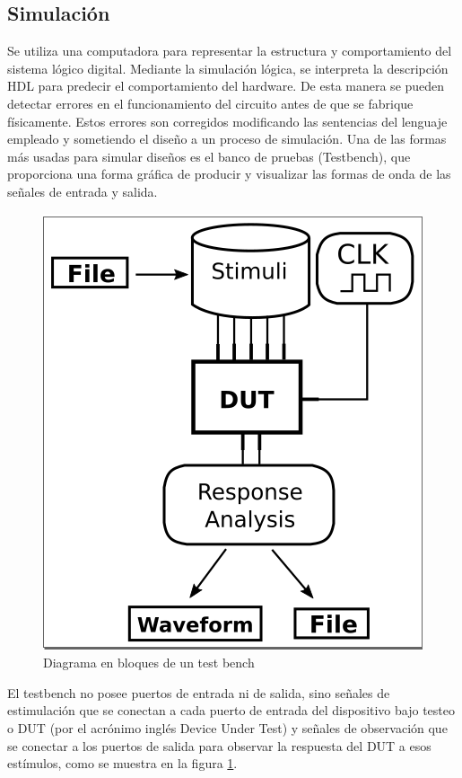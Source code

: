 \subsection{Simulación}
Se utiliza una computadora para representar la estructura y comportamiento del sistema lógico digital. Mediante la simulación lógica, se interpreta la descripción HDL para predecir el comportamiento del hardware. De esta manera se pueden detectar errores en el funcionamiento del circuito antes de que se fabrique físicamente. Estos errores son corregidos modificando las sentencias del lenguaje empleado y sometiendo el diseño a un proceso de simulación. Una de las formas más usadas para simular diseños es el banco de pruebas (Testbench), que proporciona una forma gráfica de producir y visualizar las formas de onda de las señales de entrada y salida.



\begin{figure}
\centering
\includegraphics[scale=.5]{./Figures/test_bench3.png}
\caption{Diagrama en bloques de un test bench}
\label{diag test bench}
\end{figure}


El testbench no posee puertos de entrada ni de salida, sino señales de estimulación que se conectan a cada puerto de entrada del dispositivo bajo testeo o DUT (por el acrónimo inglés Device Under Test) y señales de observación que se conectar a los puertos de salida para observar la respuesta del DUT a esos estímulos, como se muestra en la figura \ref{diag test bench}.


